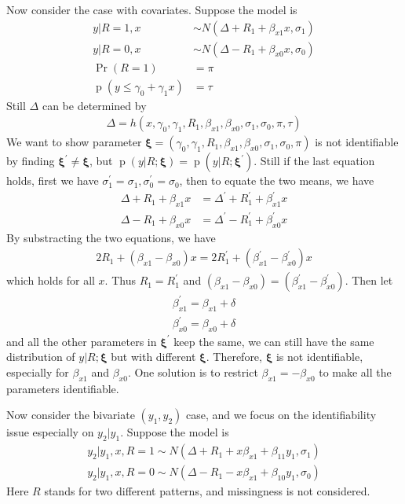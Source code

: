 \documentclass[12pt]{article}
\DeclareMathOperator{\pr}{p}
\DeclareMathOperator{\prob}{Pr}
\begin{document}
Now consider the case with covariates. Suppose the model is
\begin{align*}
  y | R = 1, x & \sim N(\Delta + R_1 + \beta_{x1} x , \sigma_1) \\
  y | R = 0, x & \sim N(\Delta - R_1 + \beta_{x0} x, \sigma_0) \\
  \prob (R = 1) & = \pi \\
  \pr (y \leq \gamma_0 + \gamma_1 x ) & = \tau
\end{align*}
Still $\Delta$ can be determined by
\begin{align*}
  \Delta = h(x, \gamma_0, \gamma_1, R_1, \beta_{x1}, \beta_{x0},
  \sigma_1, \sigma_0, \pi , \tau)
\end{align*}
We want to show parameter $\bm \xi = (\gamma_0, \gamma_1, R_1,
\beta_{x1}, \beta_{x0}, \sigma_1, \sigma_0, \pi )$ is not identifiable
by finding $\bm \xi^{'} \neq \bm \xi$, but $\pr (y | R; \bm \xi) = \pr
(y | R; \bm \xi^{'})$. Still if the last equation holds, first we have
$\sigma_1^{'} = \sigma_1, \sigma_0^{'} = \sigma_0$, then to equate the
two means, we have
\begin{align*}
  \Delta + R_1 + \beta_{x1} x & = \Delta^{'} + R_1^{'} + \beta_{x1}^{'}x \\
  \Delta - R_1 + \beta_{x0} x & = \Delta^{'} - R_1^{'} +
  \beta_{x0}^{'}x
\end{align*}
By substracting the two equations, we have
\begin{align*}
  2R_1 + (\beta_{x1} - \beta_{x0}) x = 2R_1^{'} + (\beta_{x1}^{'} -
  \beta_{x0}^{'}) x
\end{align*}
which holds for all $x$. Thus $R_1 = R_1^{'}$ and $(\beta_{x1} -
\beta_{x0}) = (\beta_{x1}^{'} - \beta_{x0}^{'})$. Then let
\begin{align*}
  \beta_{x1}^{'} =  \beta_{x1} + \delta\\
  \beta_{x0}^{'} = \beta_{x0} + \delta
\end{align*}
and all the other parameters in $\bm \xi^{'}$ keep the same, we can
still have the same distribution of $y|R; \bm \xi$ but with different
$\bm \xi$. Therefore, $\bm \xi$ is not identifiable, especially for
$\beta_{x1} $ and $\beta_{x0}$. One solution is to restrict
$\beta_{x1} = - \beta_{x0}$ to make all the parameters identifiable.

Now consider the bivariate $(y_1, y_2)$ case, and we focus on the
identifiability issue especially on $y_2|y_1$. Suppose the model is
\begin{align*}
  y_2 | y_1, x, R = 1 \sim N(\Delta + R_1 + x\beta_{x1} + \beta_{11}y_1, \sigma_1) \\
  y_2 | y_1, x, R = 0 \sim N(\Delta - R_1 - x\beta_{x1} +
  \beta_{10}y_1, \sigma_0)
\end{align*}
Here $R$ stands for two different patterns, and missingness is not
considered.
\end{document}

